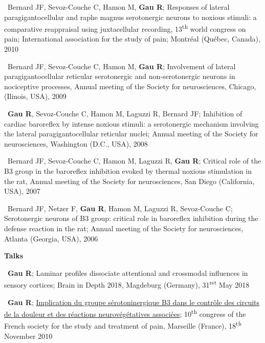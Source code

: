 \documentclass[a4paper,12pt,oneside]{letter}
\begin{document}
{\textbullet~Bernard JF, Sevoz-Couche C, Hamon M, \textbf{Gau R}; Responses of lateral paragigantocellular and raphe magnus serotonergic neurons to noxious stimuli: a comparative reappraisal using juxtacellular recording, 13\textsuperscript{th} world congress on pain; International association for the study of pain; Montréal (Québec, Canada), 2010

\textbullet~Bernard JF, Sevoz-Couche C, Hamon M, \textbf{Gau R}; Involvement of lateral paragigantocellular reticular serotonergic and non-serotonergic neurons in nociceptive processes, Annual meeting of the Society for neurosciences, Chicago, (Ilinois, USA), 2009

\textbullet~\textbf{Gau R}, Sevoz-Couche C, Hamon M, Laguzzi R, Bernard JF; Inhibition of cardiac baroreflex by intense noxious stimuli: a serotonergic mechanism involving the lateral paragigantocellular reticular nuclei; Annual meeting of the Society for neurosciences, Washington (D.C., USA), 2008

\textbullet~Bernard JF, Sevoz-Couche C, Hamon M, Laguzzi R, \textbf{Gau R}; Critical role of the B3 group in the baroreflex inhibition evoked by thermal noxious stimulation in the rat, Annual meeting of the Society for neurosciences, San Diego (California, USA), 2007

\textbullet~Bernard JF, Netzer F, \textbf{Gau R}, Hamon M, Laguzzi R, Sevoz-Couche C; Serotonergic neurons of B3 group: critical role in baroreflex inhibition during the defense reaction in the rat; Annual meeting of the Society for neurosciences, Atlanta (Georgia, USA), 2006


\begin{center}
\large\textbf{Talks}
\end{center}

\textbullet~\textbf{Gau R}; Laminar profiles dissociate attentional and crossmodal influences in sensory cortices; Brain in Depth 2018, Magdeburg (Germany), 31\textsuperscript{rst} May 2018

\textbullet~\textbf{Gau R}; \href{http://www.researchgate.net/profile/Remi_Gau/publication/312084405_Implication_du_groupe_serotoninergique_B3_dans_le_controle_des_circuits_de_la_douleur_et_des_reactions_neurovegetatives_associees/links/586e5f4a08ae6eb871bcfcc2?origin=publication_detail&ev=pub_int_prw_xdl&msrp=fq7qspniFbcYB53CbrroAtz2DNXxUJar7CmckJaw6O2YzI7LWasFAW99t9G74Z5sL-KLoJT2Dqv8D075R3ghy55Fy6xPne3_ARZvM87O3Ao.5ii75N_9y4vKCns-VUuTTDNhKb6ruhYALqaObgtdOB4WIkUSArh9tdzN9AtPRWz68YGcjTb3scxfWZy6tYxnSg.naSDUCbUZHM6gF6BaFbjpF3ARcyIPTBh1UsuA1cVoOZQsoPMn9YGNC2UsgdGA0P28xoO8bXY1221-tRVtfrUZA}{Implication du groupe sérotoninergique B3 dans le contrôle des circuits de la douleur et des réactions neurovégétatives associées}; 10\textsuperscript{th} congress of the French society for the study and treatment of pain, Marseille (France), 18\textsuperscript{th} November 2010


}
\end{document}
